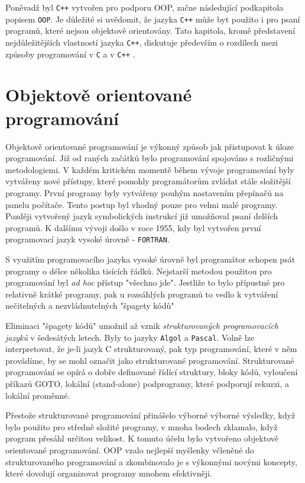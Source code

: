     Poněvadž byl \texttt{C++} vytvořen pro podporu OOP, začne následující podkapitola popis\-em 
    \texttt{OOP}. Je důležité si uvědomit, že jazyka \texttt{C++} může byt použito i pro psaní 
    programů, které nejsou objektově orientovány. Tato kapitola, kromě představení nejdůležitějších 
    vlastností jazyka \texttt{C++}, diskutuje především o rozdílech mezi způsoby programování v 
    \texttt{C} a v \texttt{C++} \cite[p.~20]{Schildt}.
  
  \section{Objektově orientované programování}
    Objektově orientované programování je výkonný způsob jak přistupovat k úloze programování. Již 
    od raných začátků bylo programování spojováno s rozličnými metodologiemi. V každém kritickém 
    momentě během vývoje programování byly vytvářeny nové přístupy, které pomohly programátorům 
    zvládat stále složitější programy. První programy byly vytvářeny pouhým nastavením přepínačů na 
    panelu počítače. Tento postup byl vhodný pouze pro velmi malé programy. Později vytvořený jazyk 
    symbolických instrukcí již umožňoval psaní delších programů. K dalšímu vývoji došlo v roce 
    1955, kdy byl vytvořen první programovací jazyk vysoké úrovně - \texttt{FORTRAN}.
  
    S využitím programovacího jazyka vysoké úrovně byl programátor schopen psát programy o délce 
    několika tisících řádků. Nejstarší metodou použitou pro programování byl \emph{ad hoc} přístup 
    "všechno jde". Jestliže to bylo přípustné pro relativně krátké programy, pak u rozsáhlých 
    programů to vedlo k vytváření nečitelných a nezvládnutelných "špagety kódů"
  
    Eliminaci "špagety kódů" umožnil až vznik \emph{strukturovaných programovacích jazyků} v 
    šedesátých letech. Byly to jazyky \texttt{Algol} a \texttt{Pascal}. Volně lze interpretovat, že 
    je-li jazyk C strukturovaný, pak typ programování, které v něm provádíme, by se mohl označit 
    jako strukturované programování. Strukturované programování se opírá o dobře definované řídící 
    struktury, bloky kódů, vyloučení příkazů GOTO, lokální (stand-alone) podprogramy, které 
    podporují rekurzi, a lokální proměnné.
  
    Přestože strukturované programování přinášelo výborné výborné výsledky, když bylo použito pro 
    středně složité programy, v mnoha bodech zklamalo, když program přesáhl určitou velikost. K 
    tomuto účelu bylo vytvořeno objektově orientované programování. OOP vzalo nejlepší myšlenky 
    včleněné do strukturovaného programování a zkombinovalo je s výkonnými novými koncepty, které 
    dovolují organizovat programy mnohem efektivněji.
  
